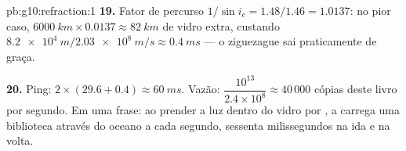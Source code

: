 \begin{solution}{pb:g10:refraction:1}
\textbf{19.} Fator de percurso $1/\sin i_c = 1.48/1.46 = 1.0137$: no pior
caso, $\qty{6000}{km} \times 0.0137 \approx \qty{82}{km}$ de vidro extra,
custando $\qty{8.2e4}{m} / \qty{2.03e8}{m/s} \approx \qty{0.4}{ms}$ ---
o ziguezague sai praticamente de graça.

\textbf{20.} Ping: $2 \times (29.6 + 0.4) \approx \qty{60}{ms}$. Vazão:
$\dfrac{10^{13}}{2.4 \times 10^8} \approx 40\,000$ cópias deste livro por
segundo. Em uma frase: ao prender a luz dentro do vidro por , a  carrega uma biblioteca através do oceano a cada
segundo, sessenta milissegundos na ida e na volta.
\end{solution}
